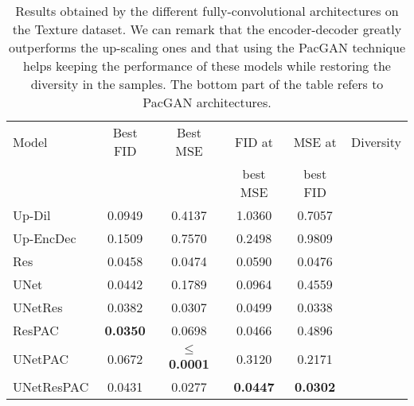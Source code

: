 \begin{table}
	\centering
	\begin{tabular}{l c c c c c }
		\Bigrule
		Model           & Best \ac{FID} & Best \ac{MSE} & \ac{FID} at & \ac{MSE} at & Diversity\\
		&&&best \ac{MSE} & best \ac{FID} & \\
		\bigrule
		Up-Dil      & 0.0949 & 0.4137 & 1.0360 & 0.7057 & {\color{green}\cmark } \\
		Up-EncDec  & 0.1509 & 0.7570 & 0.2498 & 0.9809 & {\color{green}\cmark } \\
		Res      & 0.0458 & 0.0474 & 0.0590 & 0.0476 & {\color{red}\xmark } \\
		UNet        & 0.0442 & 0.1789 & 0.0964 & 0.4559 & {\color{red}\xmark } \\
		UNetRes & 0.0382 & 0.0307 & 0.0499 & 0.0338 & {\color{red}\xmark } \\
		\bigrule
		ResPAC &  \textbf{0.0350} & 0.0698 & 0.0466 & 0.4896 & {\color{green}\cmark } \\
		UNetPAC &  0.0672 & \textbf{$\leq$ 0.0001} & 0.3120 & 0.2171&  {\color{green}\cmark } \\
		UNetResPAC & 0.0431 & 0.0277 & \textbf{0.0447} & \textbf{0.0302} &  {\color{green}\cmark }\\

	\end{tabular}
	
	\caption[Results on the Texture dataset for all the selected architectures]{Results obtained by the different fully-convolutional architectures on the Texture dataset. We can remark that the encoder-decoder greatly outperforms the up-scaling ones and that using the PacGAN technique helps keeping the performance of these models while restoring the diversity in the samples. The bottom part of the table refers to PacGAN architectures.}
	\label{tab:ablation}
\end{table}

